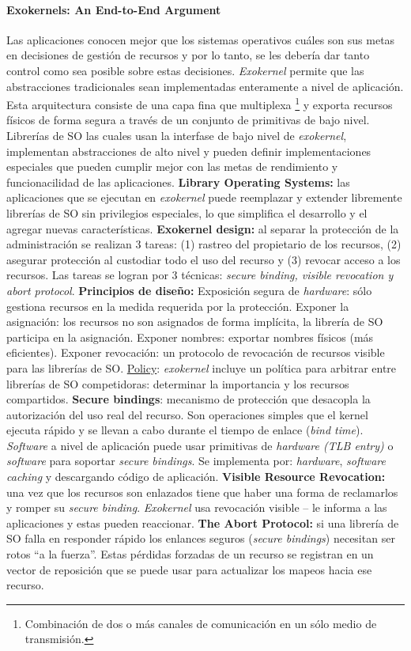 \paragraph{\textnormal{\textbf{Exokernels: An End-to-End Argument}}}
Las aplicaciones conocen mejor que los sistemas operativos cuáles son sus metas en decisiones de gestión de recursos y por lo tanto, se les debería dar tanto control como sea posible sobre estas decisiones. \textit{Exokernel} permite que las abstracciones tradicionales sean implementadas enteramente a nivel de aplicación. Esta arquitectura consiste de una capa fina que multiplexa  \footnote{Combinación de dos o más canales de comunicación en un sólo medio de transmisión.} y exporta recursos físicos de forma segura a través de un conjunto de primitivas de bajo nivel. Librerías de SO las cuales usan la interfase de bajo nivel de \textit{exokernel}, implementan abstracciones de alto nivel y pueden definir implementaciones especiales que pueden cumplir mejor con las metas de rendimiento y funcionacilidad de las aplicaciones. \textbf{Library Operating Systems:} las aplicaciones que se ejecutan en \textit{exokernel} puede reemplazar y extender libremente librerías de SO sin privilegios especiales, lo que simplifica el desarrollo y el agregar nuevas características. \textbf{Exokernel design:} al separar la protección de la administración se realizan 3 tareas: (1) rastreo del propietario de los recursos, (2) asegurar protección al custodiar todo el uso del recurso y (3) revocar acceso a los recursos. Las tareas se logran por 3 técnicas: \textit{secure binding, visible revocation \textnormal{y} abort protocol}. \textbf{Principios de diseño:} Exposición segura de \textit{hardware}: sólo gestiona recursos en la medida requerida por la protección. Exponer la asignación: los recursos no son asignados de forma implícita, la librería de SO participa en la asignación. Exponer nombres: exportar nombres físicos (más eficientes). Exponer revocación: un protocolo de revocación de recursos visible para las librerías de SO. \underline{Policy}: \textit{exokernel} incluye un política para arbitrar entre librerías de SO competidoras: determinar la importancia y los recursos compartidos. \textbf{Secure bindings}: mecanismo de protección que desacopla la autorización del uso real del recurso. Son operaciones simples que el kernel ejecuta rápido y se llevan a cabo durante el tiempo de enlace (\textit{bind time}). \textit{Software} a nivel de aplicación puede usar primitivas de \textit{hardware (TLB entry)} o \textit{software} para soportar \textit{secure bindings}. Se implementa por: \textit{hardware}, \textit{software caching} y descargando código de aplicación. \textbf{Visible Resource Revocation:} una vez que los recursos son enlazados tiene que haber una forma de reclamarlos y romper su \textit{secure binding}. \textit{Exokernel} usa revocación visible -- le informa a las aplicaciones y estas pueden reaccionar. \textbf{The Abort Protocol:} si una librería de SO falla en responder rápido los enlances seguros (\textit{secure bindings}) necesitan ser rotos ``a la fuerza''. Estas pérdidas forzadas de un recurso se registran en un vector de reposición que se puede usar para actualizar los mapeos hacia ese recurso.

